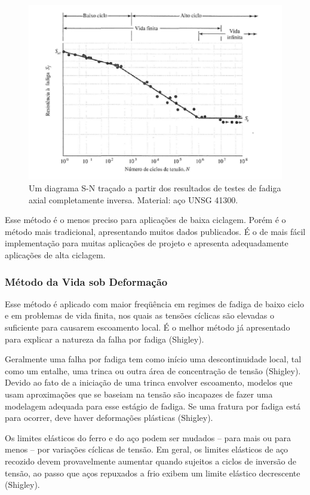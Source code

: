 \begin{figure}[h]
\centering
\includegraphics[scale=0.8]{figuras/num_ciclos.png}
\caption{Um diagrama S-N traçado a partir dos resultados de testes de fadiga axial completamente inversa. Material: aço UNSG 41300.}
\label{fadiga-axial}
\end{figure}

Esse método é o menos preciso para aplicações de baixa ciclagem. Porém é o método mais tradicional, apresentando muitos dados publicados. É o de mais fácil implementação para muitas aplicações de projeto e apresenta adequadamente aplicações de alta ciclagem.

\subsubsection{Método da Vida sob Deformação}

Esse método é aplicado com maior freqüência em regimes de fadiga de baixo ciclo e em problemas de vida finita, nos quais as tensões cíclicas são elevadas o suficiente para causarem escoamento local. É o melhor método já apresentado para explicar a natureza da falha por fadiga (Shigley).

	Geralmente uma falha por fadiga tem como início uma descontinuidade local, tal como um entalhe, uma trinca ou outra área de concentração de tensão (Shigley). Devido ao fato de a iniciação de uma trinca envolver escoamento, modelos que usam aproximações que se baseiam na tensão são incapazes de fazer uma modelagem adequada para esse estágio de fadiga. Se uma fratura por fadiga está para ocorrer, deve haver deformações plásticas (Shigley).
	
	Os limites elásticos do ferro e do aço podem ser mudados – para mais ou para menos – por variações cíclicas de tensão. Em geral, os limites elásticos de aço recozido devem provavelmente aumentar quando sujeitos a ciclos de inversão de tensão, ao passo que aços repuxados a frio exibem um limite elástico decrescente (Shigley).

